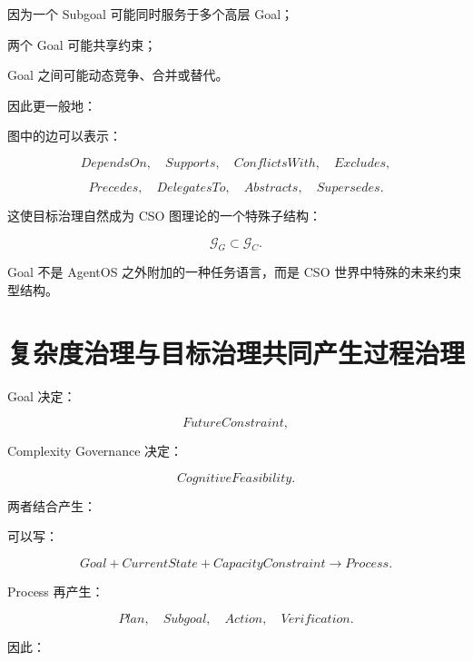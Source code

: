 因为一个 Subgoal 可能同时服务于多个高层 Goal；

两个 Goal 可能共享约束；

Goal 之间可能动态竞争、合并或替代。

因此更一般地：

\begin{statementbox}
\centering
{}
\end{statementbox}

图中的边可以表示：

\[
DependsOn,
\quad
Supports,
\quad
ConflictsWith,
\quad
Excludes,
\]

\[
Precedes,
\quad
DelegatesTo,
\quad
Abstracts,
\quad
Supersedes.
\]

这使目标治理自然成为 CSO 图理论的一个特殊子结构：

\[
\boxed{
\mathcal G_G
\subset
\mathcal G_C.
}
\]

Goal 不是 AgentOS 之外附加的一种任务语言，而是 CSO 世界中特殊的未来约束型结构。


\section{复杂度治理与目标治理共同产生过程治理}

Goal 决定：

\[
FutureConstraint,
\]

Complexity Governance 决定：

\[
CognitiveFeasibility.
\]

两者结合产生：

\begin{statementbox}
\centering
{}
\end{statementbox}

可以写：

\[
Goal
+
CurrentState
+
CapacityConstraint
\rightarrow
Process.
\]

Process 再产生：

\[
Plan,
\quad
Subgoal,
\quad
Action,
\quad
Verification.
\]

因此：

\begin{statementbox}
\centering
{}
\end{statementbox}

